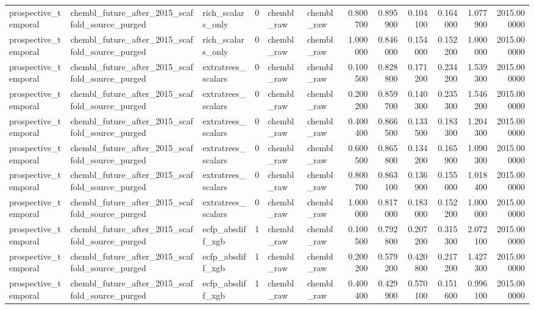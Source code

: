 \begin{longtable}{lllrllrrrrrr}
prospective\_temporal & chembl\_future\_after\_2015\_scaffold\_source\_purged & rich\_scalars\_only & 0 & chembl\_raw & chembl\_raw & 0.800700 & 0.895900 & 0.104100 & 0.164000 & 1.077900 & 2015.000000 \\
prospective\_temporal & chembl\_future\_after\_2015\_scaffold\_source\_purged & rich\_scalars\_only & 0 & chembl\_raw & chembl\_raw & 1.000000 & 0.846000 & 0.154000 & 0.152200 & 1.000000 & 2015.000000 \\
prospective\_temporal & chembl\_future\_after\_2015\_scaffold\_source\_purged & extratrees\_scalars & 0 & chembl\_raw & chembl\_raw & 0.100500 & 0.828800 & 0.171200 & 0.234200 & 1.539300 & 2015.000000 \\
prospective\_temporal & chembl\_future\_after\_2015\_scaffold\_source\_purged & extratrees\_scalars & 0 & chembl\_raw & chembl\_raw & 0.200200 & 0.859700 & 0.140300 & 0.235300 & 1.546200 & 2015.000000 \\
prospective\_temporal & chembl\_future\_after\_2015\_scaffold\_source\_purged & extratrees\_scalars & 0 & chembl\_raw & chembl\_raw & 0.400400 & 0.866500 & 0.133500 & 0.183300 & 1.204300 & 2015.000000 \\
prospective\_temporal & chembl\_future\_after\_2015\_scaffold\_source\_purged & extratrees\_scalars & 0 & chembl\_raw & chembl\_raw & 0.600500 & 0.865800 & 0.134200 & 0.165900 & 1.090300 & 2015.000000 \\
prospective\_temporal & chembl\_future\_after\_2015\_scaffold\_source\_purged & extratrees\_scalars & 0 & chembl\_raw & chembl\_raw & 0.800700 & 0.863100 & 0.136900 & 0.155000 & 1.018400 & 2015.000000 \\
prospective\_temporal & chembl\_future\_after\_2015\_scaffold\_source\_purged & extratrees\_scalars & 0 & chembl\_raw & chembl\_raw & 1.000000 & 0.817000 & 0.183000 & 0.152200 & 1.000000 & 2015.000000 \\
prospective\_temporal & chembl\_future\_after\_2015\_scaffold\_source\_purged & ecfp\_absdiff\_xgb & 1 & chembl\_raw & chembl\_raw & 0.100500 & 0.792800 & 0.207200 & 0.315300 & 2.072100 & 2015.000000 \\
prospective\_temporal & chembl\_future\_after\_2015\_scaffold\_source\_purged & ecfp\_absdiff\_xgb & 1 & chembl\_raw & chembl\_raw & 0.200200 & 0.579200 & 0.420800 & 0.217200 & 1.427300 & 2015.000000 \\
prospective\_temporal & chembl\_future\_after\_2015\_scaffold\_source\_purged & ecfp\_absdiff\_xgb & 1 & chembl\_raw & chembl\_raw & 0.400400 & 0.429900 & 0.570100 & 0.151600 & 0.996100 & 2015.000000 \\

\end{longtable}
